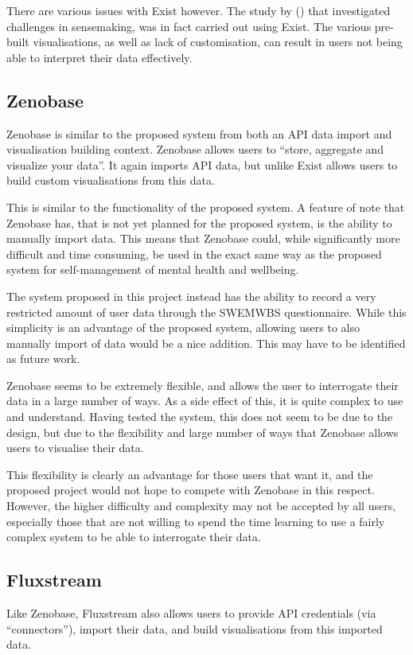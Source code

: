 \documentclass[11pt,openright,a4paper]{report}
\begin{document}
There are various issues with Exist however. The study by \citeauthor{jones2016sensemaking} (\citeyear{jones2016sensemaking}) that investigated challenges in sensemaking, was in fact carried out using Exist. The various pre-built visualisations, as well as lack of customisation, can result in users not being able to interpret their data effectively.

\subsection{Zenobase}
Zenobase \parencite{zenobase} is similar to the proposed system from both an API data import and visualisation building context. Zenobase allows users to \enquote{store, aggregate and visualize your data}. It again imports API data, but unlike Exist allows users to build custom visualisations from this data.

This is similar to the functionality of the proposed system. A feature of note that Zenobase has, that is not yet planned for the proposed system, is the ability to manually import data. This means that Zenobase could, while significantly more difficult and time consuming, be used in the exact same way as the proposed system for self-management of mental health and wellbeing.

The system proposed in this project instead has the ability to record a very restricted amount of user data through the SWEMWBS questionnaire. While this simplicity is an advantage of the proposed system, allowing users to also manually import of data would be a nice addition. This may have to be identified as future work.

Zenobase seems to be extremely flexible, and allows the user to interrogate their data in a large number of ways. As a side effect of this, it is quite complex to use and understand. Having tested the system, this does not seem to be due to the design, but due to the flexibility and large number of ways that Zenobase allows users to visualise their data.

This flexibility is clearly an advantage for those users that want it, and the proposed project would not hope to compete with Zenobase in this respect. However, the higher difficulty and complexity may not be accepted by all users, especially those that are not willing to spend the time learning to use a fairly complex system to be able to interrogate their data.

\subsection{Fluxstream}
Like Zenobase, Fluxstream \parencite{fluxstream} also allows users to provide API credentials (via \enquote{connectors}), import their data, and build visualisations from this imported data.
\end{document}
